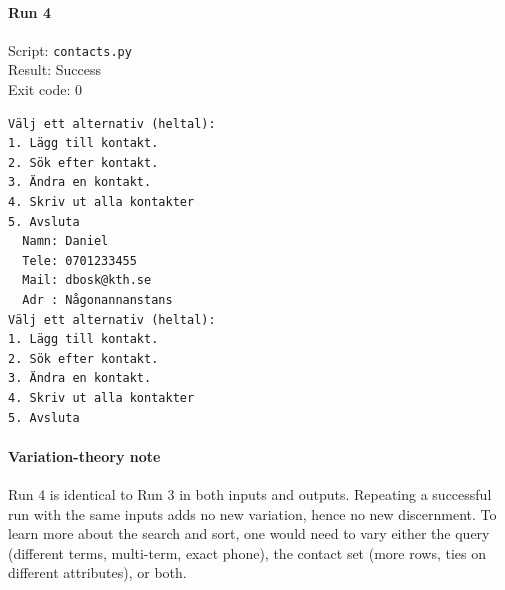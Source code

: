 \documentclass{article}
\begin{document}
\noindent
\begin{minipage}[t]{0.48\linewidth}
\end{minipage}
\hfill
\begin{minipage}[t]{0.48\linewidth}
\paragraph{Run 4}
Script: \texttt{contacts.py} \\
Result: Success \\
Exit code: 0

\begin{verbatim}
Välj ett alternativ (heltal):
1. Lägg till kontakt.
2. Sök efter kontakt.
3. Ändra en kontakt.
4. Skriv ut alla kontakter
5. Avsluta
  Namn: Daniel
  Tele: 0701233455
  Mail: dbosk@kth.se
  Adr : Någonannanstans
Välj ett alternativ (heltal):
1. Lägg till kontakt.
2. Sök efter kontakt.
3. Ändra en kontakt.
4. Skriv ut alla kontakter
5. Avsluta
\end{verbatim}
\end{minipage}

\paragraph*{Variation-theory note}
Run 4 is identical to Run 3 in both inputs and outputs. Repeating a
successful run with the same inputs adds no new variation, hence no
new discernment. To learn more about the search and sort, one would
need to vary either the query (different terms, multi-term, exact
phone), the contact set (more rows, ties on different attributes), or
both.

\vspace{1em}
\end{document}
